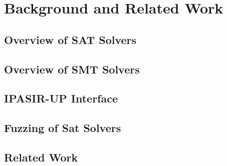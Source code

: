 \chapter{Background and Related Work}

\section{Overview of SAT Solvers}

\section{Overview of SMT Solvers}

\section{IPASIR-UP Interface}

\section{Fuzzing of Sat Solvers}

\section{Related Work}
